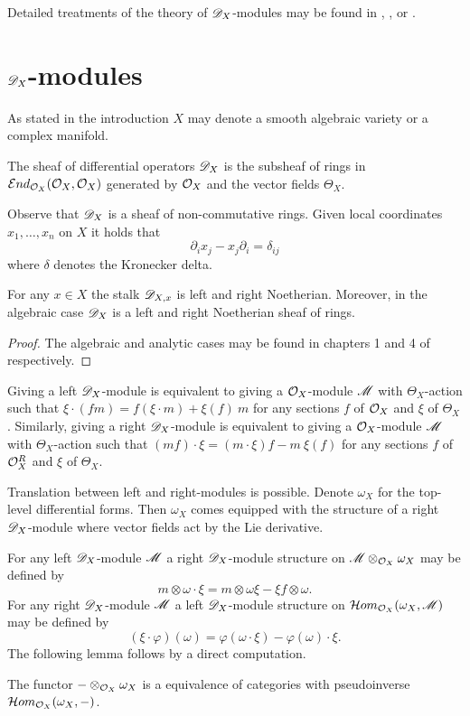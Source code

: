 Detailed treatments of the theory of $\mathscr{D}_X$-modules may be found in  \cite{bjork1979rings}, \cite{kashiwara2003d}, \cite{hotta2007d} or \cite{borel1987algebraic}.
\section{$\mathscr{D}_X$-modules}
As stated in the introduction $X$ may denote a smooth algebraic variety or a complex manifold.
\begin{definition}
  The sheaf of differential operators $\mathscr{D}_X$ is the subsheaf of rings in $\mathcal{E}nd_{\mathcal{O}_X}(\mathcal{O}_X,\mathcal{O}_X)$ generated by $\mathcal{O}_X$ and the vector fields $\Theta_X$.
\end{definition}
Observe that $\mathscr{D}_X$ is a sheaf of non-commutative rings.
Given local coordinates $x_1,\ldots, x_n$ on $X$ it holds that
$$\partial_i x_j - x_j\partial_i = \delta_{ij} $$
where $\delta$ denotes the Kronecker delta.
\begin{lemma}
  For any $x\in X$ the stalk $\mathscr{D}_{X,x}$ is left and right Noetherian. Moreover, in the algebraic case $\mathscr{D}_X$ is a left and right Noetherian sheaf of rings.
\end{lemma}
\begin{proof}
  The algebraic and analytic cases may be found in chapters 1 and 4 of \cite{hotta2007d} respectively.
\end{proof}
Giving a left $\mathscr{D}_X$-module is equivalent to giving a $\mathcal{O}_X$-module $\mathscr{M}$ with $\Theta_X$-action such that
$\xi\cdot (fm) = f (\xi \cdot m)  + \xi(f)\ m  $
for any sections $f$ of $\mathcal{O}_X$ and $\xi$ of $\Theta_X$. Similarly, giving a right $\mathscr{D}_X$-module is equivalent to giving a $\mathcal{O}_X$-module $\mathscr{M}$ with $\Theta_X$-action such that
$(mf)\cdot\xi = (m\cdot\xi)f - m\ \xi(f) $ for any sections $f$ of $\mathcal{O}_X^R$ and $\xi$ of $\Theta_X$.

Translation between left and right-modules is possible.
Denote $\omega_X$ for the top-level differential forms.
Then $\omega_X$ comes equipped with the structure of a right $\mathscr{D}_X$-module where vector fields act by the Lie derivative.

For any left $\mathscr{D}_X$-module $\mathscr{M}$ a right $\mathscr{D}_X$-module structure on $\mathscr{M}\otimes_{\mathcal{O}_X}\omega_X$ may be defined by
$$m\otimes \omega \cdot \xi = m\otimes \omega\xi - \xi f \otimes \omega.$$
For any right $\mathscr{D}_X$-module $\mathscr{M}$ a left $\mathscr{D}_X$-module structure on $\mathcal{H}om_{\mathcal{O}_X}(\omega_X, \mathscr{M})$ may be defined by
$$(\xi\cdot \varphi)(\omega) = \varphi(\omega \cdot \xi) - \varphi(\omega)\cdot \xi. $$
The following lemma follows by a direct computation.
\begin{lemma}
  The functor ${-}\otimes_{\mathcal{O}_X}\omega_X$ is a equivalence of categories with pseudoinverse  $\mathcal{H}om_{\mathcal{O}_X}(\omega_X,{-})$.
\end{lemma}
